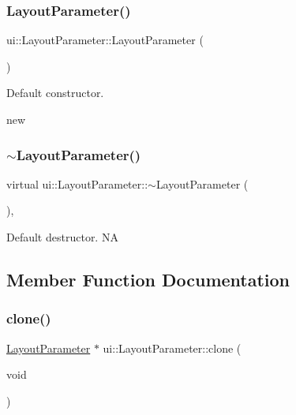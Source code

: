 \subsubsection{\texorpdfstring{Layout\+Parameter()}{LayoutParameter()}\hspace{0.1cm}{\footnotesize\ttfamily [2/2]}}
{\footnotesize\ttfamily ui\+::\+Layout\+Parameter\+::\+Layout\+Parameter (\begin{DoxyParamCaption}{ }\end{DoxyParamCaption})\hspace{0.3cm}{\ttfamily [inline]}}

Default constructor.

new \mbox{\label{classui_1_1LayoutParameter_a7892278bef91cf0e24c5c2743ace8ae7}} 
\subsubsection{\texorpdfstring{$\sim$\+Layout\+Parameter()}{~LayoutParameter()}\hspace{0.1cm}{\footnotesize\ttfamily [2/2]}}
{\footnotesize\ttfamily virtual ui\+::\+Layout\+Parameter\+::$\sim$\+Layout\+Parameter (\begin{DoxyParamCaption}{ }\end{DoxyParamCaption})\hspace{0.3cm}{\ttfamily [inline]}, {\ttfamily [virtual]}}

Default destructor.  NA 

\subsection{Member Function Documentation}
\mbox{\label{classui_1_1LayoutParameter_add4261a5b99cda5ccfef214ef78b3e2b}} 
\subsubsection{\texorpdfstring{clone()}{clone()}\hspace{0.1cm}{\footnotesize\ttfamily [1/2]}}
{\footnotesize\ttfamily \hyperlink{classui_1_1LayoutParameter}{Layout\+Parameter} $\ast$ ui\+::\+Layout\+Parameter\+::clone (\begin{DoxyParamCaption}\item[{void}]{ }\end{DoxyParamCaption})}

